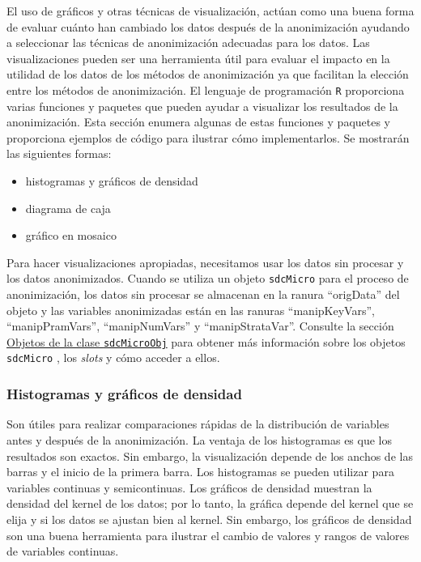 \documentclass[
]{book}
\providecommand{\tightlist}{%
  \setlength{\itemsep}{0pt}\setlength{\parskip}{0pt}}
\theoremstyle{definition}
\theoremstyle{definition}
\theoremstyle{definition}
\theoremstyle{definition}
\theoremstyle{remark}
\begin{document}
El uso de gráficos y otras técnicas de visualización, actúan como una buena forma de evaluar cuánto han cambiado los datos después de la anonimización ayudando a seleccionar las técnicas de anonimización adecuadas para los datos. Las visualizaciones pueden ser una herramienta útil para evaluar el impacto en la utilidad de los datos de los métodos de anonimización ya que facilitan la elección entre los métodos de anonimización. El lenguaje de programación \texttt{R} proporciona varias funciones y paquetes que pueden ayudar a visualizar los resultados de la
anonimización. Esta sección enumera algunas de estas funciones y paquetes y proporciona ejemplos de código para ilustrar cómo implementarlos. Se mostrarán las siguientes formas:

\begin{itemize}
\tightlist
\item
  histogramas y gráficos de densidad
\item
  diagrama de caja
\item
  gráfico en mosaico
\end{itemize}

Para hacer visualizaciones apropiadas, necesitamos usar los datos sin procesar y los datos anonimizados. Cuando se utiliza un objeto \texttt{sdcMicro} para el proceso de anonimización, los datos sin procesar se almacenan en la ranura ``origData'' del objeto y las variables anonimizadas están en las ranuras ``manipKeyVars'', ``manipPramVars'', ``manipNumVars'' y ``manipStrataVar''. Consulte la sección \protect\hyperlink{objetos-de-la-clase-sdcmicroobj}{Objetos de la clase \texttt{sdcMicroObj}} para obtener más información sobre los objetos \texttt{sdcMicro} , los \emph{slots} y cómo acceder a ellos.

\hypertarget{histogramas-y-gruxe1ficos-de-densidad}{%
\subsubsection{Histogramas y gráficos de densidad}\label{histogramas-y-gruxe1ficos-de-densidad}}

Son útiles para realizar comparaciones rápidas de la distribución de variables antes y después de la anonimización. La ventaja de los histogramas es que los resultados son exactos. Sin embargo, la
visualización depende de los anchos de las barras y el inicio de la primera barra. Los histogramas se pueden utilizar para variables continuas y semicontinuas. Los gráficos de densidad muestran la densidad del kernel de los datos; por lo tanto, la gráfica depende del kernel que se elija y si los datos se ajustan bien al kernel. Sin embargo, los gráficos de densidad son una buena herramienta para ilustrar el cambio de valores y rangos de valores de variables continuas.
\end{document}
